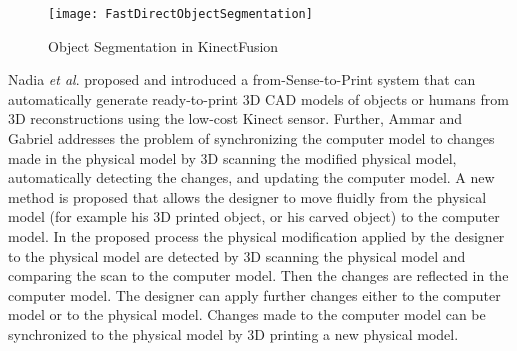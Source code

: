 %
\begin{figure}[t]
\centering
\texttt{[image: FastDirectObjectSegmentation]}
\caption{Object Segmentation in KinectFusion \cite{KinectFusionIzadi_2011}}
\label{FastDirectObjectSegmentation}
\end{figure}%
%
Nadia \textit{et al}. \cite{3DPrintingFrom3DSensing13} proposed and introduced a from-Sense-to-Print system that can automatically generate ready-to-print \gls{3D} CAD models of objects or humans from \gls{3D} reconstructions using the low-cost Kinect sensor. Further, Ammar and Gabriel \cite{3DModelingForPrinting15} addresses the problem of synchronizing the computer model to changes made in the physical model by \gls{3D} scanning the modified physical model, automatically detecting the changes, and updating the computer model. A new method is proposed that allows the designer to move fluidly from the physical model (for example his \gls{3D} printed object, or his carved object) to the computer model. In the proposed process the physical modification applied by the designer to the physical model are detected by \gls{3D} scanning the physical model and comparing the scan to the computer model. Then the changes are reflected in the computer model. The designer can apply further changes either to the computer model or to the physical model. Changes made to the computer model can be synchronized to the physical model by \gls{3D} printing a new physical model.
%
%
